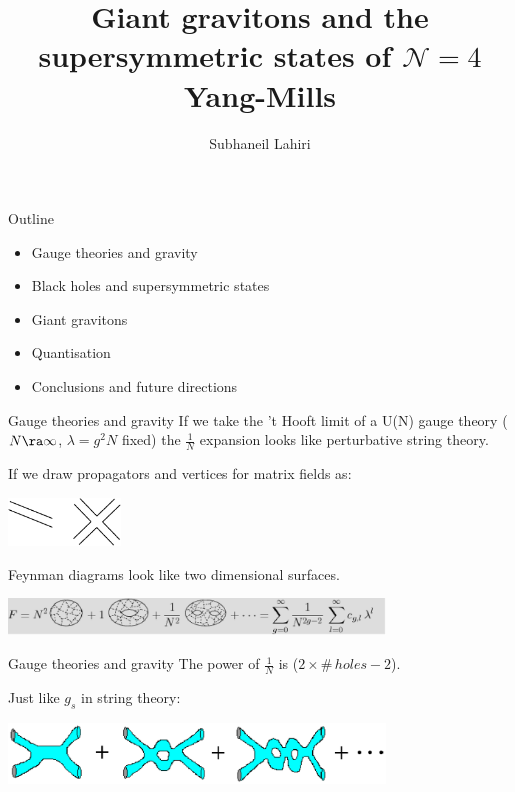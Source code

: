 \documentclass[%
pdf,
colorBG, slideColor,
total,
serpaggi
%
]{prosper}
\title {Giant gravitons and the supersymmetric states of  $\mathcal{N}=4$
Yang-Mills}
\author{Subhaneil Lahiri}
\begin{document}
\maketitle


\begin{slide}{Outline}
%
 \begin{itemize}
    \item Gauge theories and gravity
    \item Black holes and supersymmetric states
    \item Giant gravitons
    \item Quantisation
    \item Conclusions and future directions
 \end{itemize}
%
\end{slide}


\begin{slide}{Gauge theories and gravity}
%
 If we take the 't Hooft limit of a U(N) gauge theory ($N\ra\infty$,
 $\lambda=g^2N$ fixed) the $\frac{1}{N}$ expansion looks like
 perturbative string theory.

 \vp If we draw propagators and vertices for matrix fields as:
 \begin{center}
    \includegraphics[width=3cm]{thooft.eps}
 \end{center}
 Feynman diagrams look like two dimensional surfaces.
 \begin{center}
    \includegraphics[width=10cm]{riem.eps}
 \end{center}
%
\end{slide}


\begin{slide}{Gauge theories and gravity}
%
  The power of $\frac{1}{N}$ is ($2\times \#\, holes - 2$).

  \vp Just like $g_s$ in string theory:
 \begin{center}
    \includegraphics[width=10cm]{pert.eps}
 \end{center}
%
\end{slide}
\end{document}

